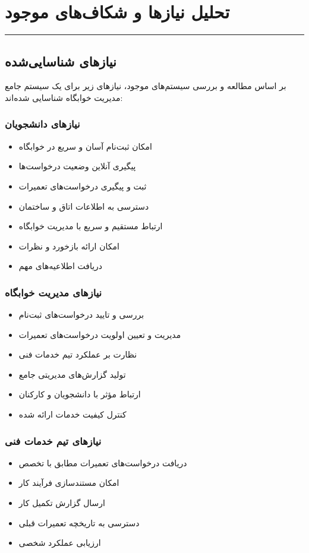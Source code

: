 \documentclass[12pt,a4paper]{report}
\begin{document}
	\section{تحلیل نیازها و شکاف‌های موجود}
	
	\noindent\rule{\textwidth}{0.4pt}
	
	\subsection{نیازهای شناسایی‌شده}
	
	بر اساس مطالعه و بررسی سیستم‌های موجود، نیازهای زیر برای یک سیستم جامع مدیریت خوابگاه شناسایی شده‌اند:
	
	\subsubsection{نیازهای دانشجویان}
	\begin{itemize}
		\item امکان ثبت‌نام آسان و سریع در خوابگاه
		\item پیگیری آنلاین وضعیت درخواست‌ها
		\item ثبت و پیگیری درخواست‌های تعمیرات
		\item دسترسی به اطلاعات اتاق و ساختمان
		\item ارتباط مستقیم و سریع با مدیریت خوابگاه
		\item امکان ارائه بازخورد و نظرات
		\item دریافت اطلاعیه‌های مهم
	\end{itemize}
	
	\subsubsection{نیازهای مدیریت خوابگاه}
	\begin{itemize}
		\item بررسی و تایید درخواست‌های ثبت‌نام
		\item مدیریت و تعیین اولویت درخواست‌های تعمیرات
		\item نظارت بر عملکرد تیم خدمات فنی
		\item تولید گزارش‌های مدیریتی جامع
		\item ارتباط مؤثر با دانشجویان و کارکنان
		\item کنترل کیفیت خدمات ارائه شده
	\end{itemize}
	
	\subsubsection{نیازهای تیم خدمات فنی}
	\begin{itemize}
		\item دریافت درخواست‌های تعمیرات مطابق با تخصص
		\item امکان مستندسازی فرآیند کار
		\item ارسال گزارش تکمیل کار
		\item دسترسی به تاریخچه تعمیرات قبلی
		\item ارزیابی عملکرد شخصی
	\end{itemize}
	
\end{document}
